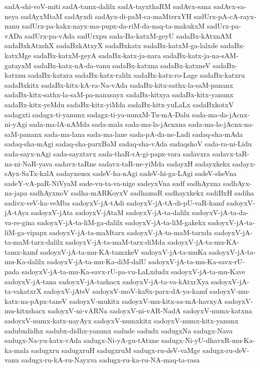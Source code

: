 {sadA-shi-voV-miti
sadA-tamx-dalilx
sadA-tayxthaRM
sadAvx-sana
sadAvx-sa-neya
sadAyxMtaM
sadAyxdi
sadAyx-di-paM-ca-maMterxYH
sadUrx-pA-cA-rayx-nanu
sadUrx-pa-kakx-nayx-ma-pupx-da-riM-da-naq-ta-makukxM
sadUrx-pa-vADa
sadUrx-pa-vAda
sadUrxpu
sada-Ba-katxM-geyU
sadaBx-kAtxnAM
sadaBxkAtxshX
sadaBxkAtxyX
sadaBxkatx
sadaBx-katxM-ga-lalxde
sadaBx-katxMge
sadaBx-katxM-geyA
sadaBx-katx-ja-nara
sadaBx-katx-ja-na-sAM-gatayxM
sadaBx-katx-nA-da-vanu
sadaBx-katxna
sadaBx-katxneV
sadaBx-katxnu
sadaBx-katxra
sadaBx-katx-ralilx
sadaBx-katx-ro-Lage
sadaBx-katxru
sadaBxkitx
sadaBx-kitx-kA-ra-Na-vAda
sadaBx-kitx-sathx-la-saM-pananx
sadaBx-kitx-sathx-la-saM-pa-nanxsayx
sadaBx-kitxya
sadaBx-kitx-yanunx
sadaBx-kitx-yeMdu
sadaBx-kitx-yiMda
sadaBx-kitx-yuLaLx
sadaBxkotxV
sadagxti
sadagx-ti-yanunx
sadagx-ti-ya-nunxM-Tu-mA-Dalu
sada-ma-da-jAcnx-ni-yAgi
sada-ma-lA-nAMda
sada-mala
sada-ma-la-jAcnxna
sada-ma-la-jAcnx-na-saM-pananx
sada-ma-lana
sada-ma-lane
sada-pA-da-ne-Ladi
sadaq-sha-mAda
sadaq-sha-mAgi
sadaq-sha-parxBaM
sadaq-sha-vAda
sadaqshoV
sada-ra-ni-Lidu
sada-sayx-nAgi
sada-sayxtavx
sada-thaR-rA-gi-papx-vara
sadavxra
sadavx-taR-na-ni-NaR-yava
sadavx-taRne
sadavx-taR-ne-yiMda
sadayxH
sadayxkekx
sadayx-sAyx-SaTx-kalA
sadayxsusx
sadeV-ha-nAgi
sadeV-hi-ga-LAgi
sadeV-sheVna
sadeY-vA-paR-NiVyaM
sade-vu-ta-va-nige
sadeyxVna
sadf
sadhAyxna
sadhAyx-na-japa
sadhAyxnoV
sadha-mARKoyxV
sadhamaR
sadhayxkekx
sadiBxH
sadiha
sadivx-veV-ka-veMba
sadoyxV-jA-tAdi
sadoyxV-jA-tA-di-pU-vaR-kamf
sadoyxV-jA-tAya
sadoyxV-jAta
sadoyxV-jAtaM
sadoyxV-jA-ta-dalilx
sadoyxV-jA-ta-da-va-re-gina
sadoyxV-jA-ta-liM-ga-dalilx
sadoyxV-jA-ta-liM-gakekx
sadoyxV-jA-ta-liM-ga-vipapx
sadoyxV-jA-ta-maMtarx
sadoyxV-jA-ta-maM-tarxda
sadoyxV-jA-ta-maM-tarx-dalilx
sadoyxV-jA-ta-maM-tarx-diMda
sadoyxV-jA-ta-mu-KA-tamx-kamf
sadoyxV-jA-ta-mu-KA-tamxkeV
sadoyxV-jA-ta-muKa
sadoyxV-jA-ta-mu-Ka-dalilx
sadoyxV-jA-ta-mu-Ka-diM-dalU
sadoyxV-jA-ta-mu-Ka-savx-rU-pada
sadoyxV-jA-ta-mu-Ka-savx-rU-pa-vu-LaLxdudx
sadoyxV-jA-ta-mu-Kave
sadoyxV-jA-tana
sadoyxV-jA-tashacx
sadoyxV-jA-ta-va-kAtxrXya
sadoyxV-jA-ta-vakatxrX
sadoyxV-jAteV
sadoyxV-moV-kaSx-parx-dA-ya-kamf
sadoyxV-mu-katx-na-pApx-taneV
sadoyxV-mukitx
sadoyxV-mu-kitx-sa-mA-havxyA
sadoyxV-mu-kitxshacx
sadoyxV-ni-vARNa
sadoyxV-ni-vAR-NadA
sadoyxV-numx-katxna
sadoyxV-numx-katx-nayAyx
sadoyxV-numxkitx
sadoyxV-numx-kitx-yanunx
sadubxdidhx
sadubx-didhx-yanunx
sadude
sadudx
sadugxNa
sadugx-Nava
sadugx-Na-yu-katx-vAda
sadugx-Ni-yA-gu-tAtxne
sadugx-Ni-yU-dhavxR-mu-Ka-ka-mala
sadugxru
sadugxruH
sadugxruM
sadugx-ru-deV-vaMge
sadugx-ru-deV-vanu
sadugx-ru-kA-ru-Nayxva
sadugx-ru-ka-ru-NA-maq-ta-rasa
}
